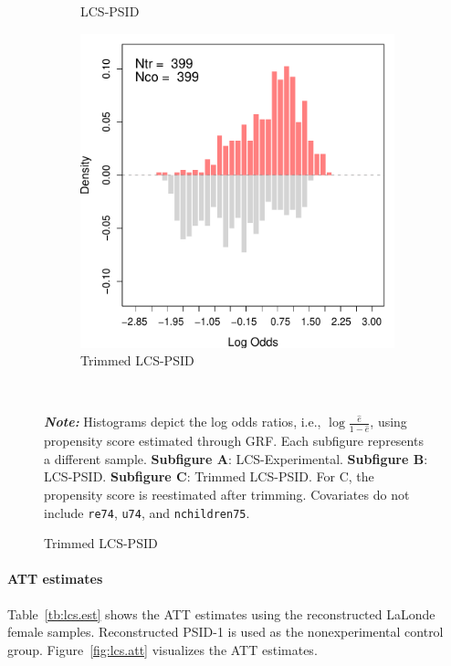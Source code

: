 \documentclass[letterpaper,12pt,leqno]{article}
\begin{document}
\begin{figure}[!ht]
\begin{minipage}[c]{\textwidth}
\begin{subfigure}{0.32\linewidth}
            \caption{LCS-PSID}
        \end{subfigure}
         \begin{subfigure}{0.32\linewidth}
            \includegraphics[width=\linewidth]{odds_lcs_psid_trim.pdf}
            \caption{Trimmed LCS-PSID}
        \end{subfigure}
    \end{minipage}%
    \\\raggedright
     {\footnotesize\textbf{\textit{Note:}} Histograms depict the log odds ratios, i.e., $\log\frac{\hat{e}}{1-\hat{e}}$, using propensity score estimated through GRF. Each subfigure represents a different sample. \textbf{Subfigure A}: LCS-Experimental. \textbf{Subfigure B}: LCS-PSID. \textbf{Subfigure C}: Trimmed LCS-PSID. For C, the propensity score is reestimated after trimming. Covariates do not include \texttt{re74}, \texttt{u74}, and \texttt{nchildren75}.}
\end{figure}
\clearpage

\paragraph{ATT estimates} Table~\ref{tb:lcs.est} shows the ATT estimates using the reconstructed LaLonde female samples. Reconstructed PSID-1 is used as the nonexperimental control group.  Figure~\ref{fig:lcs.att} visualizes the ATT estimates.
\end{document}
